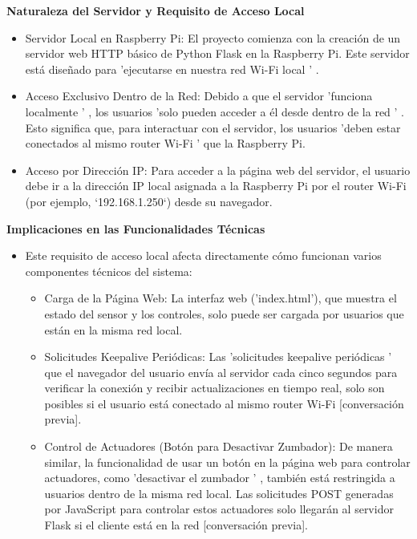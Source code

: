 \documentclass{report}
\begin{document}
\textbf{Naturaleza del Servidor y Requisito de Acceso Local}
\begin{itemize}
    \item Servidor Local en Raspberry Pi:  El proyecto comienza con la creación de un servidor web HTTP básico de Python Flask en la Raspberry Pi. 
    Este servidor está diseñado para   'ejecutarse en nuestra red Wi-Fi local ' .
    \item Acceso Exclusivo Dentro de la Red:  Debido a que el servidor   'funciona localmente ' , los usuarios   'solo pueden acceder a él desde dentro 
    de la red ' . Esto significa que, para interactuar con el servidor, los usuarios   'deben estar conectados al mismo router Wi-Fi '  que la Raspberry Pi.
    \item Acceso por Dirección IP:  Para acceder a la página web del servidor, el usuario debe ir a la dirección IP local asignada a la Raspberry Pi por 
    el router Wi-Fi (por ejemplo, `192.168.1.250`) desde su navegador.
\end{itemize}

\textbf{Implicaciones en las Funcionalidades Técnicas}
\begin{itemize}
\item Este requisito de acceso local afecta directamente cómo funcionan varios componentes técnicos del sistema:
    \begin{itemize}
        \item Carga de la Página Web:  La interfaz web ('index.html'), que muestra el estado del sensor y los controles, solo puede ser cargada por 
        usuarios que están en la misma red local.
        \item Solicitudes Keepalive Periódicas:  Las   'solicitudes keepalive periódicas '  que el navegador del usuario envía al servidor cada cinco 
        segundos para verificar la conexión y recibir actualizaciones en tiempo real, solo son posibles si el usuario está conectado al mismo router 
        Wi-Fi [conversación previa].
        \item Control de Actuadores (Botón para Desactivar Zumbador):  De manera similar, la funcionalidad de usar un botón en la página web para 
        controlar actuadores, como   'desactivar el zumbador ' , también está restringida a usuarios dentro de la misma red local. Las solicitudes 
        POST generadas por JavaScript para controlar estos actuadores solo llegarán al servidor Flask si el cliente está en la red [conversación previa].
    \end{itemize}
\end{itemize}
\end{document}
